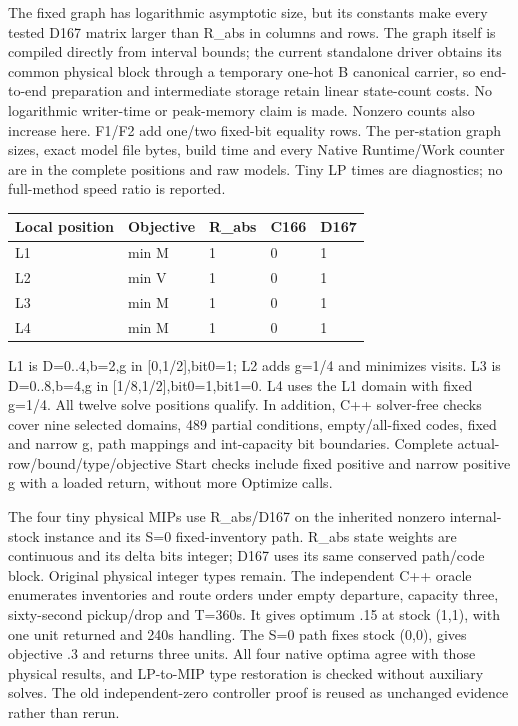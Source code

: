 \documentclass[
  american,
  11pt,
]{article}
\newcounter{none} %
\begin{document}
The fixed graph has logarithmic asymptotic size, but its constants make
every tested D167 matrix larger than R\_\allowbreak{}abs in columns and rows. The
graph itself is compiled directly from interval bounds; the current
standalone driver obtains its common physical block through a temporary
one-hot B canonical carrier, so end-to-end preparation and intermediate
storage retain linear state-count costs. No logarithmic writer-time or
peak-memory claim is made. Nonzero counts also increase here. F1/F2 add
one/two fixed-bit equality rows. The per-station graph sizes, exact
model file bytes, build time and every Native Runtime/Work counter are
in the complete positions and raw models. Tiny LP times are diagnostics;
no full-method speed ratio is reported.

\Needspace{182pt}

{\def\LTcaptype{none} %
\begin{longtable}[]{@{}lllll@{}}
\toprule\noalign{}
Local position & Objective & R\_\allowbreak{}abs & C166 & D167 \\
\midrule\noalign{}
\endhead
\bottomrule\noalign{}
\endlastfoot
L1 & min M & 1 & 0 & 1 \\
L2 & min V & 1 & 0 & 1 \\
L3 & min M & 1 & 0 & 1 \\
L4 & min M & 1 & 0 & 1 \\
\end{longtable}
}

L1 is D=0..4,b=2,g in {[}0,1/2{]},bit0=1; L2 adds g=1/4 and minimizes
visits. L3 is D=0..8,b=4,g in {[}1/8,1/2{]},bit0=1,bit1=0. L4 uses the
L1 domain with fixed g=1/4. All twelve solve positions qualify. In
addition, C++ solver-free checks cover nine selected domains, 489
partial conditions, empty/all-fixed codes, fixed and narrow g, path
mappings and int-capacity bit boundaries. Complete
actual-row/bound/type/objective Start checks include fixed positive and
narrow positive g with a loaded return, without more Optimize calls.

The four tiny physical MIPs use R\_\allowbreak{}abs/D167 on the inherited nonzero
internal-stock instance and its S=0 fixed-inventory path. R\_\allowbreak{}abs state
weights are continuous and its delta bits integer; D167 uses its same
conserved path/code block. Original physical integer types remain. The
independent C++ oracle enumerates inventories and route orders under
empty departure, capacity three, sixty-second pickup/drop and T=360s. It
gives optimum .15 at stock (1,1), with one unit returned and 240s
handling. The S=0 path fixes stock (0,0), gives objective .3 and returns
three units. All four native optima agree with those physical results,
and LP-to-MIP type restoration is checked without auxiliary solves. The
old independent-zero controller proof is reused as unchanged evidence
rather than rerun.
\end{document}
